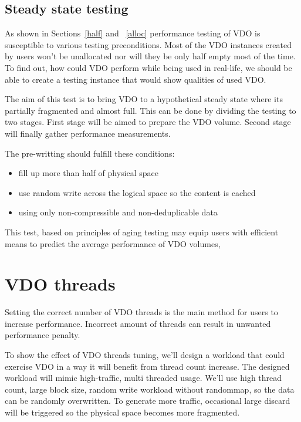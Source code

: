 \documentclass[
  color, %
  table, %
  lof,   %
  lot,   %
]{fithesis3}
\begin{document}
\clearpage

\subsection{Steady state testing}
As shown in Sections~\ref{half} and ~\ref{alloc} performance testing of VDO is susceptible to various testing preconditions. Most of the VDO instances created by users won't be unallocated nor will they be only half empty most of the time. To find out, how could VDO perform while being used in real-life, we should be able to create a testing instance that would show qualities of used VDO.

The aim of this test is to bring VDO to a hypothetical steady state where its partially fragmented and almost full. This can be done by dividing the testing to two stages. First stage will be aimed to prepare the VDO volume. Second stage will finally gather performance measurements.

The pre-writting should fulfill these conditions:
\begin{itemize}
    \item fill up more than half of physical space
    \item use random write across the logical space so the content is cached
    \item using only non-compressible and non-deduplicable data
\end{itemize}

This test, based on principles of aging testing may equip users with efficient means to predict the average performance of VDO volumes,



\clearpage
\section{VDO threads}
Setting the correct number of VDO threads is the main method for users to increase performance. Incorrect amount of threads can result in unwanted performance penalty.

To show the effect of VDO threads tuning, we'll design a workload that could exercise VDO in a way it will benefit from thread count increase. The designed workload will mimic high-traffic, multi threaded usage. We'll use high thread count, large block size, random write workload without randommap, so the data can be randomly overwritten. To generate more traffic, occasional large discard will be triggered so the physical space becomes more fragmented.
\end{document}
